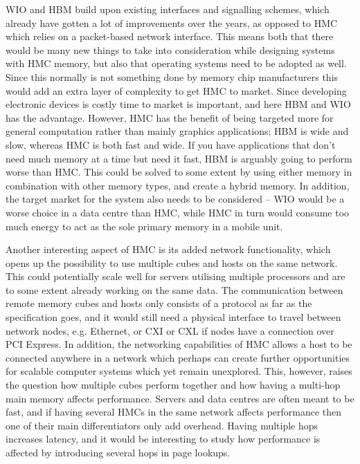 WIO and HBM build upon existing interfaces and signalling schemes, which already have gotten a lot of improvements over the years, as opposed to HMC which relies on a packet-based network interface. This means both that there would be many new things to take into consideration while designing systems with HMC memory, but also that operating systems need to be adopted as well. Since this normally is not something done by memory chip manufacturers this would add an extra layer of complexity to get HMC to market. Since developing electronic devices is costly time to market is important, and here HBM and WIO has the advantage. However, HMC has the benefit of being targeted more for general computation rather than mainly graphics applications; HBM is wide and slow, whereas HMC is both fast and wide. If you have applications that don't need much memory at a time but need it fast, HBM is arguably going to perform worse than HMC. This could be solved to some extent by using either memory in combination with other memory types, and create a hybrid memory. In addition, the target market for the system also needs to be considered -- WIO would be a worse choice in a data centre than HMC, while HMC in turn would consume too much energy to act as the sole primary memory in a mobile unit.
\bigskip

Another interesting aspect of HMC is its added network functionality, which opens up the possibility to use multiple cubes and hosts on the same network. This could potentially scale well for servers utilising multiple processors and are to some extent already working on the same data. The communication between remote memory cubes and hosts only consists of a protocol as far as the specification goes, and it would still need a physical interface to travel between network nodes, e.g. Ethernet, or CXI or CXL if nodes have a connection over PCI Express. In addition, the networking capabilities of HMC allows a host to be connected anywhere in a network which perhaps can create further opportunities for scalable computer systems which yet remain unexplored. This, however, raises the question how multiple cubes perform together and how having a multi-hop main memory affects performance. Servers and data centres are often meant to be fast, and if having several HMCs in the same network affects performance then one of their main differentiators only add overhead. Having multiple hops increases latency, and it would be interesting to study how performance is affected by introducing several hops in page lookups.
\bigskip
